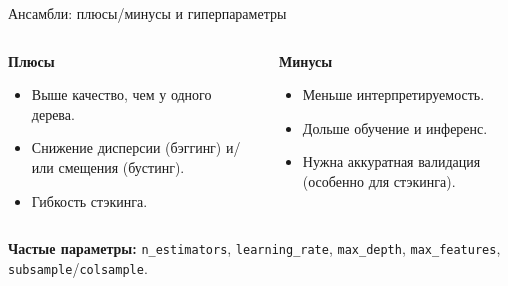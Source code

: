 \documentclass[12pt]{beamer}
\begin{document}
\begin{frame}{Ансамбли: плюсы/минусы и гиперпараметры}
	\begin{columns}[T]
		\begin{column}{0.48\textwidth}
			\textbf{Плюсы}
			\begin{itemize}
				\item Выше качество, чем у одного дерева.
				\item Снижение дисперсии (бэггинг) и/или смещения (бустинг).
				\item Гибкость стэкинга.
			\end{itemize}
		\end{column}
		\begin{column}{0.48\textwidth}
			\textbf{Минусы}
			\begin{itemize}
				\item Меньше интерпретируемость.
				\item Дольше обучение и инференс.
				\item Нужна аккуратная валидация (особенно для стэкинга).
			\end{itemize}
		\end{column}
	\end{columns}
	\vspace{2mm}
	\textbf{Частые параметры:} \texttt{n\_estimators}, \texttt{learning\_rate}, \texttt{max\_depth}, \texttt{max\_features}, \texttt{subsample}/\texttt{colsample}.
\end{frame}
\end{document}
